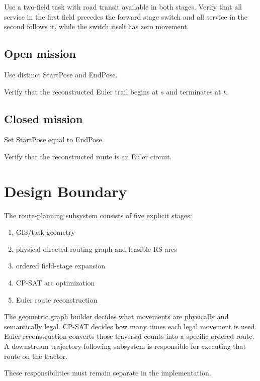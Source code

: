 \documentclass{article}
\begin{document}
Use a two-field task with road transit available in both stages. Verify that all service in the first field precedes the forward stage switch and all service in the second follows it, while the switch itself has zero movement.

\subsection{Open mission}

Use distinct StartPose and EndPose.

Verify that the reconstructed Euler trail begins at $s$ and terminates at $t$.

\subsection{Closed mission}

Set StartPose equal to EndPose.

Verify that the reconstructed route is an Euler circuit.

\section{Design Boundary}

The route-planning subsystem consists of five explicit stages:
\begin{enumerate}
\item{GIS/task geometry}
\item{physical directed routing graph and feasible RS arcs}
\item{ordered field-stage expansion}
\item{CP-SAT arc optimization}
\item{Euler route reconstruction}
\end{enumerate}

The geometric graph builder decides what movements are physically and semantically legal.
CP-SAT decides how many times each legal movement is used.
Euler reconstruction converts those traversal counts into a specific ordered route.
A downstream trajectory-following subsystem is responsible for executing that route on the tractor.

These responsibilities must remain separate in the implementation.
\end{document}
